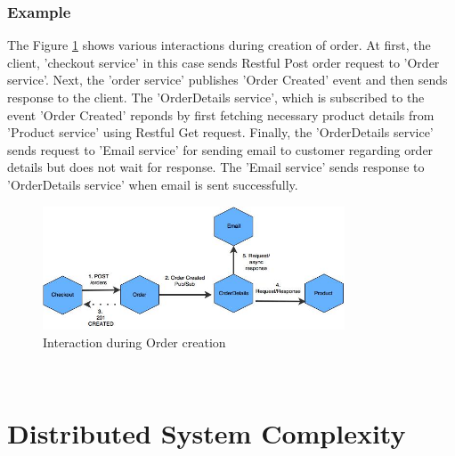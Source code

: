 \subsubsection{Example}\label{section:challanges_of_microservices_architecture/integration/example}
The Figure \ref{fig:challanges_of_microservices_architecture/integration/inter_service_communication/interaction_during_order_creation}  shows various interactions during creation of order. At first, the client, 'checkout service' in this case sends Restful Post order request to 'Order service'. Next, the 'order service' publishes 'Order Created' event and then sends response to the client. The 'OrderDetails service', which is subscribed to the event 'Order Created' reponds by first fetching necessary product details from 'Product service' using Restful Get request. Finally, the 'OrderDetails service' sends request to 'Email service' for sending email to customer regarding order details but does not wait for response. The 'Email service' sends response to 'OrderDetails service' when email is sent successfully.
\begin{figure}[H]
\begin{center}
\includegraphics[width=0.8\textwidth]{figures/challanges_two_interaction_example}
\caption{Interaction during Order creation}
\label{fig:challanges_of_microservices_architecture/integration/inter_service_communication/interaction_during_order_creation}
\end{center}
\end{figure}
\\

\section{Distributed System Complexity}\label{section:challanges_of_microservices_architecture/distributed_system}
